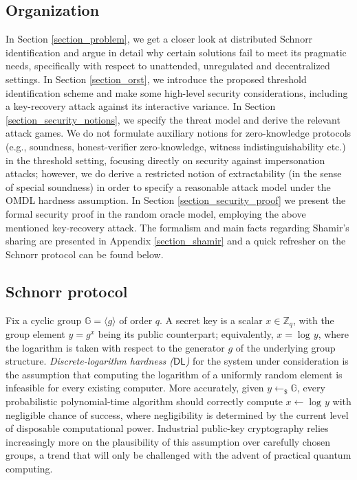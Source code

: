 \documentclass{iacrtrans}
\begin{document}
\subsection{Organization}\label{section_organization}
In Section \ref{section_problem}, we get a closer look
at distributed Schnorr identification
and argue in detail why certain solutions
fail to meet its pragmatic needs,
specifically with respect to
unattended, unregulated and decentralized settings.
In Section \ref{section_orst}, we introduce the
proposed threshold identification scheme
and make some high-level security considerations,
including a key-recovery attack against
its interactive variance.
In Section \ref{section_security_notions},
we specify the threat model
and derive the relevant attack games.
We do not formulate auxiliary notions
for zero-knowledge protocols
(e.g., soundness, honest-verifier zero-knowledge,
witness indistinguishability etc.)
in the threshold setting,
focusing directly on security against impersonation attacks;
however, we do derive a restricted notion of extractability
(in the sense of special soundness)
in order to specify a reasonable attack model
under the OMDL hardness assumption.
In Section \ref{section_security_proof} we present
the formal security proof in the random oracle model,
employing the above mentioned key-recovery attack.
The formalism and main facts regarding Shamir's sharing
are presented in Appendix \ref{section_shamir}
and a quick refresher on the
Schnorr protocol can be found below.

\subsection{Schnorr protocol}\label{section_schnorr}

\noindent
Fix a cyclic group $\mathbb{G} = \langle g \rangle$ of order $q$.
A secret key is a scalar $x \in \mathbb{Z}_q$,
with the group element $y = g ^ x$
being its public counterpart;
equivalently, $x = \log\hspace{1pt} y$,
where the logarithm is taken with respect to the
generator $g$ of the underlying group structure.
\textit{Discrete-logarithm hardness \textup{($\mathsf{DL}$)}} for
the system under consideration
is the assumption that computing the logarithm of
a uniformly random element is infeasible
for every existing computer.
More accurately, given $y \leftarrow_\$ \mathbb{G}$,
every probabilistic polynomial-time algorithm
should correctly compute $x \leftarrow \log\hspace{1pt} y$
with negligible chance of success,
where negligibility is determined by
the current level of disposable computational power.
Industrial public-key cryptography relies increasingly more
on the plausibility of this assumption over
carefully chosen groups, a trend that will
only be challenged with the advent of practical quantum computing.
\end{document}
